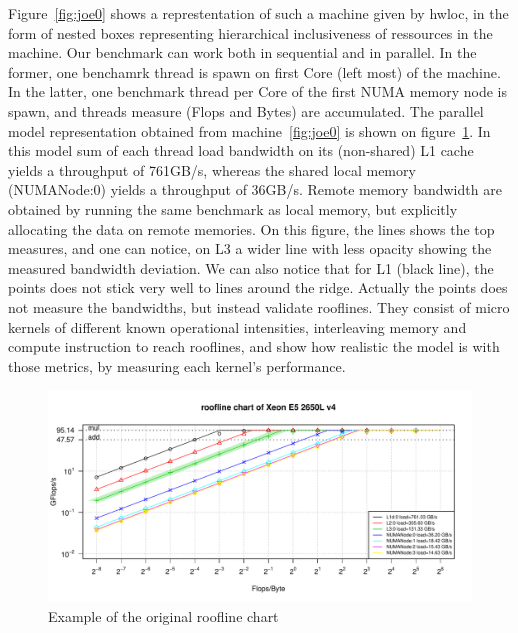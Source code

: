 \documentclass[runningheads,a4paper]{llncs}
\begin{document}
Figure~\ref{fig:joe0} shows a represtentation of such a machine given by hwloc, in the form of nested boxes representing
hierarchical inclusiveness of ressources in the machine. Our benchmark can work both in sequential and in parallel. In the former,
one benchamrk thread is spawn on first Core (left most) of the machine. In the latter, one benchmark thread per Core of the first
NUMA memory node is spawn, and threads measure (Flops and Bytes) are accumulated. The parallel model representation obtained from
machine~\ref{fig:joe0} is shown on figure~\ref{fig:orig_model}. In this model sum of each thread load bandwidth on its (non-shared)
 L1 cache yields a throughput of 761GB/s, whereas the shared local memory (NUMANode:0) yields a throughput of 36GB/s.
Remote memory bandwidth are obtained by running the same benchmark as local memory, but explicitly allocating the data on remote
 memories.
On this figure, the lines shows the top measures, and one can notice, on L3 a wider line with less opacity showing the measured
bandwidth deviation.
We can also notice that for L1 (black line), the points does not stick very well to lines around the ridge. Actually the points
does not measure the bandwidths, but instead validate rooflines. They consist of micro kernels of different known operational
intensities, interleaving memory and compute instruction to reach rooflines, and show how realistic the model is with those
metrics, by measuring each kernel's performance.

\begin{figure}
  \centering
  \includegraphics[width=\textwidth]{pictures/roofline_model}
  \caption{Example of the original roofline chart}
  \label{fig:orig_model}
\end{figure}

\end{document}
